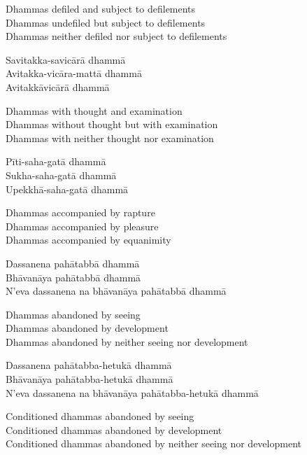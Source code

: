\begin{english}
  Dhammas defiled and subject to defilements\\
  Dhammas undefiled but subject to defilements\\
  Dhammas neither defiled nor subject to defilements
\end{english}

Savitakka-savicārā dhammā\\
Avitakka-vicāra-mattā dhammā\\
Avitakkāvicārā dhammā

\begin{english}
  Dhammas with thought and examination\\
  Dhammas without thought but with examination\\
  Dhammas with neither thought nor examination
\end{english}

Pīti-saha-gatā dhammā\\
Sukha-saha-gatā dhammā\\
Upekkhā-saha-gatā dhammā

\begin{english}
  Dhammas accompanied by rapture\\
  Dhammas accompanied by pleasure\\
  Dhammas accompanied by equanimity
\end{english}

Dassanena pahātabbā dhammā\\
Bhāvanāya pahātabbā dhammā\\
N’eva dassanena na bhāvanāya pahātabbā dhammā

\begin{english}
  Dhammas abandoned by seeing\\
  Dhammas abandoned by development\\
  Dhammas abandoned by neither seeing nor development
\end{english}

Dassanena pahātabba-hetukā dhammā\\
Bhāvanāya pahātabba-hetukā dhammā\\
N’eva dassanena na bhāvanāya pahātabba-hetukā dhammā

\begin{english}
  Conditioned dhammas abandoned by seeing\\
  Conditioned dhammas abandoned by development\\
  Conditioned dhammas abandoned by neither seeing nor development
\end{english}

